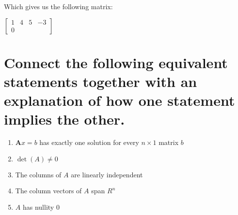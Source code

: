 \documentclass[
  letterpaper,
  DIV=11,
  numbers=noendperiod]{scrartcl}
\providecommand{\tightlist}{%
  \setlength{\itemsep}{0pt}\setlength{\parskip}{0pt}}\usepackage{longtable,booktabs,array}
\begin{document}
Which gives us the following matrix:

\(\begin{bmatrix}1 & 4 & 5 & - 3\\ 0 & \end{bmatrix}\)

\newpage{}

\newpage{}

\hypertarget{connect-the-following-equivalent-statements-together-with-an-explanation-of-how-one-statement-implies-the-other.}{%
\section{Connect the following equivalent statements together with an
explanation of how one statement implies the
other.}\label{connect-the-following-equivalent-statements-together-with-an-explanation-of-how-one-statement-implies-the-other.}}

\begin{enumerate}
\def\labelenumi{\arabic{enumi}.}
\tightlist
\item
  \(\symbf{A}x = b\) has exactly one solution for every \(n \times 1\)
  matrix \(b\)
\item
  \(\det{(A)} \neq 0\)
\item
  The columns of \(A\) are linearly independent
\item
  The column vectors of \(A\) span \(R^n\)
\item
  \(A\) has nullity 0
\end{enumerate}
\end{document}
